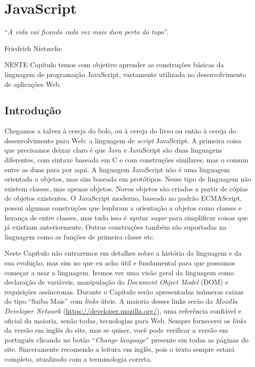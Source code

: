 \chapter{JavaScript}\label{cap:javaScript}
\epigraph{``\textit{A vida vai ficando cada vez mais dura perto do topo}''.}{Friedrich Nietzsche}

\lettrine[lines=4, lhang=0.1, lraise=0, loversize=0.2, findent=0.1em]{\textcolor{corAzulTema}{N}}{ESTE} Capítulo temos com objetivo aprender as construções básicas da linguagem de programação JavaScript, vastamente utilizada no desenvolvimento de aplicações Web.

\section{Introdução}

Chegamos a talvez à cereja do bolo, ou à cereja do livro ou então à cereja do desenvolvimento para Web: a linguagem de \textit{script} JavaScript. A primeira coisa que precisamos deixar claro é que Java e JavaScript são duas linguagens diferentes, com sintaxe baseada em C e com construções similares, mas o comum entre as duas para por aqui. A linguagem JavaScript não é uma linguagem orientada a objetos, mas sim baseada em protótipos. Nesse tipo de linguagem não existem classes, mas apenas objetos. Novos objetos são criados a partir de cópias de objetos existentes. O JavaScript moderno, baseado no padrão ECMAScript, possui algumas construções que lembram a orientação a objetos como classes e herança de entre classes, mas tudo isso é \textit{syntax sugar} para simplificar coisas que já existiam anteriormente. Outras construções também são suportadas na linguagem como as funções de primeira classe etc.

Neste Capítulo não entraremos em detalhes sobre a história da linguagem e da sua evolução, mas sim no que eu acho útil e fundamental para que possamos começar a usar a linguagem. Iremos ver uma visão geral da linguagem como declaração de variáveis, manipulação do \textit{Document Object Model} (DOM) e requisições assíncronas. Durante o Capítulo serão apresentadas inúmeras caixas do tipo ``Saiba Mais'' com \textit{links} úteis. A maioria desses links serão da \textit{Mozilla Developer Network} (\url{https://developer.mozilla.org/}), uma referência confiável e oficial da maioria, senão todas, tecnologias para Web. Sempre fornecerei os \textit{links} da versão em inglês do site, mas se quiser, você pode verificar a versão em português clicando no botão ``\textit{Change language}'' presente em todas as páginas do site. Sinceramente recomendo a leitura em inglês, pois o texto sempre estará completo, atualizado com a terminologia correta.

